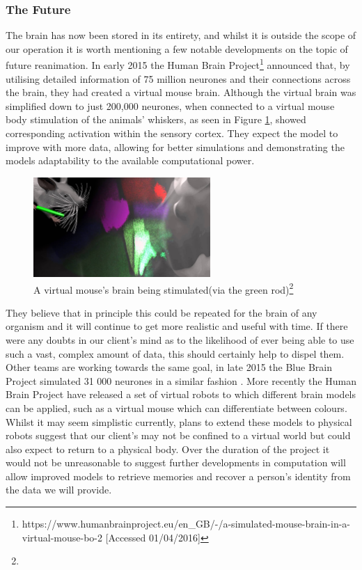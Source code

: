 \documentclass[a4paper, 11pt]{article}
\numberwithin{equation}{section}
\begin{document}
\subsubsection{The Future}
The brain has now been stored in its entirety, and whilst it is outside the scope of our operation it is worth mentioning a few notable developments on the topic of future reanimation. In early 2015 the Human Brain Project\footnote{https://www.humanbrainproject.eu/en\_GB/-/a-simulated-mouse-brain-in-a-virtual-mouse-bo-2 [Accessed 01/04/2016]} announced that, by utilising detailed information of 75 million neurones and their connections across the brain, they had created a virtual mouse brain. Although the virtual brain was simplified down to just 200,000 neurones, when connected to a virtual mouse body stimulation of the animals' whiskers, as seen in Figure \ref{virtualmouse}, showed corresponding activation within the sensory cortex. They expect the model to improve with more data, allowing for better simulations and demonstrating the models adaptability to the available computational power.
\begin{figure}[htb!]
	\centering
	
	
	\includegraphics[width=0.6\textwidth]{virtualmouse}
	\caption[A virtual mouse's brain being stimulated(via the green rod)]{\centering \label{virtualmouse}A virtual mouse's brain being stimulated(via the green rod)\footnote{}}
	
\end{figure}
 They believe that in principle this could be repeated for the brain of any organism and it will continue to get more realistic and useful with time. If there were any doubts in our client's mind as to the likelihood of ever being able to use such a vast, complex amount of data, this should certainly help to dispel them. Other teams are working towards the same goal, in late 2015 the Blue Brain Project simulated 31 000 neurones in a similar fashion \cite{markram2015reconstruction}. More recently the Human Brain Project have released a set of virtual robots to which different brain models can be applied, such as a virtual mouse which can differentiate between colours. Whilst it may seem simplistic currently, plans to extend these models to physical robots suggest that our client's may not be confined to a virtual world but could also expect to return to a physical body. Over the duration of the project it would not be unreasonable to suggest further developments in computation will allow improved models to retrieve memories and recover a person's identity from the data we will provide.
\end{document}
